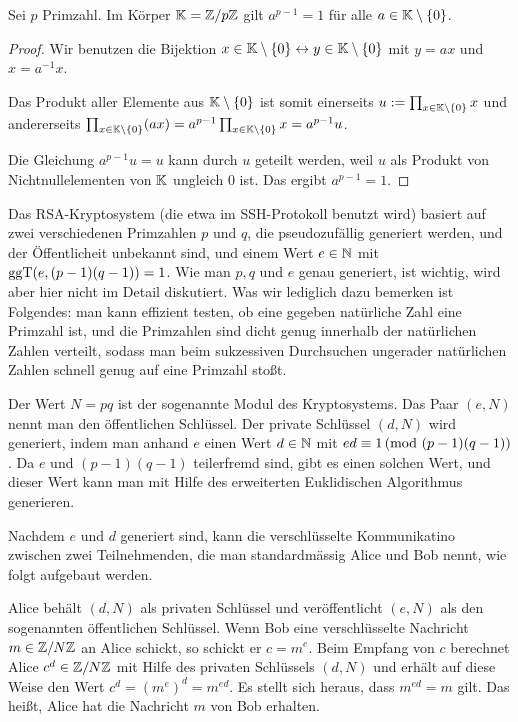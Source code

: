 	\begin{thm} 
		Sei $p$ Primzahl. Im Körper $\mathbb K = \mathbb Z / p\mathbb Z$ gilt $a^{p-1} = 1$ für alle $a \in \mathbb K \setminus \{0\}$. 
	\end{thm} 
	\begin{proof}
		Wir benutzen die Bijektion $x  \in \mathbb K \setminus \{0\}\leftrightarrow y \in \mathbb K \setminus \{0\}$ mit $y= ax$ und $x =a^{-1} x$. 
		
		
		Das Produkt aller Elemente aus $\mathbb K \setminus \{0\}$ ist somit einerseits $u:=\prod_{x \in \mathbb K \setminus \{0\} } x$ und andererseits $\prod_{x \in \mathbb K \setminus \{0\}} (a x) = a^{p-1} \prod_{x \in \mathbb K \setminus \{0\}} x = a^{p-1} u$.
		
		Die Gleichung $a^{p-1} u = u$ kann durch $u$ geteilt werden, weil $u$ als Produkt von Nichtnullelementen von $\mathbb K$ ungleich $0$ ist. Das ergibt $a^{p-1} = 1$.
	\end{proof} 
	
	Das RSA-Kryptosystem (die etwa im SSH-Protokoll benutzt wird) basiert auf zwei verschiedenen Primzahlen $p$ und $q$, die pseudozufällig generiert werden, und der Öffentlicheit unbekannt sind, und einem Wert $e \in \mathbb N$ mit $\operatorname{ggT}(e,(p-1)(q-1))= 1$. Wie man $p, q$ und $e$ genau generiert, ist wichtig, wird aber hier nicht im Detail diskutiert.  Was wir lediglich dazu bemerken ist Folgendes: man kann effizient testen, ob eine gegeben natürliche Zahl eine Primzahl ist, und die Primzahlen sind dicht genug innerhalb der natürlichen Zahlen verteilt, sodass man beim sukzessiven Durchsuchen ungerader natürlichen Zahlen schnell genug auf eine Primzahl stoßt. 
	
	Der Wert $N = pq$ ist der sogenannte Modul des Kryptosystems. Das Paar $(e,N)$ nennt man den öffentlichen Schlüssel. Der private Schlüssel $(d,N)$ wird generiert, indem man anhand $e$ einen Wert $d \in \mathbb N$ mit $e d \equiv 1 \,(\mathrm{mod} \ (p-1)(q-1))$. Da $e$ und $(p-1)(q-1)$ teilerfremd sind, gibt es einen solchen Wert, und dieser Wert kann man mit Hilfe des erweiterten Euklidischen Algorithmus generieren. 
	
	Nachdem $e$ und $d$ generiert sind, kann die verschlüsselte Kommunikatino zwischen zwei Teilnehmenden, die man standardmässig Alice und Bob nennt, wie folgt aufgebaut werden. 
	
	Alice behält $(d,N)$ als privaten Schlüssel und veröffentlicht $(e,N)$ als den sogenannten öffentlichen Schlüssel. Wenn Bob eine  verschlüsselte Nachricht $m \in  \mathbb Z / N \mathbb Z$ an Alice schickt, so schickt er $c=m^e$.  Beim Empfang von $c$ berechnet Alice $c^d \in \mathbb Z / N \mathbb Z$ mit Hilfe des privaten Schlüssels $(d,N)$ und erhält auf diese Weise den Wert $c^d = (m^e)^d = m^{ed}$. Es stellt sich heraus, dass $m^{ed} = m$ gilt. Das heißt, Alice hat die Nachricht $m$ von Bob erhalten. 
	
